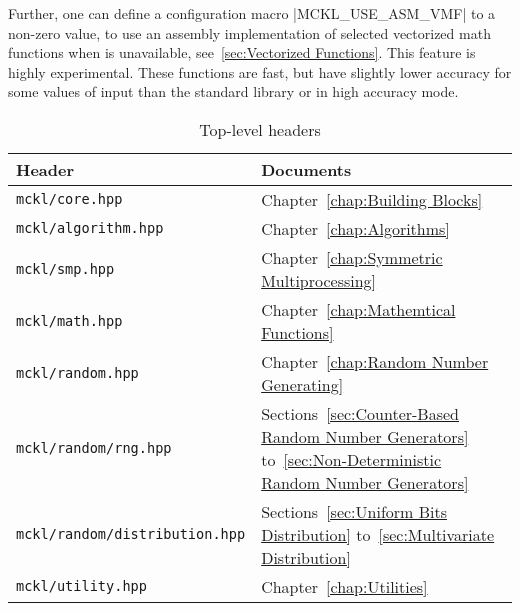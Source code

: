 Further, one can define a configuration macro |MCKL_USE_ASM_VMF| to a non-zero
value, to use an assembly implementation of selected vectorized math functions
when \mkl \vml is unavailable, see~\ref{sec:Vectorized Functions}. This feature
is highly experimental. These functions are fast, but have slightly lower
accuracy for some values of input than the standard library or \mkl \vml in
high accuracy mode.

\begin{table}[ht]
  \begin{tabularx}{\textwidth}{LL}
    \toprule
    Header & Documents \\
    \midrule
    \texttt{mckl/core.hpp}     & Chapter~\ref{chap:Building Blocks}          \\
    \texttt{mckl/algorithm.hpp}& Chapter~\ref{chap:Algorithms}               \\
    \texttt{mckl/smp.hpp}      & Chapter~\ref{chap:Symmetric Multiprocessing}\\
    \texttt{mckl/math.hpp}     & Chapter~\ref{chap:Mathemtical Functions}    \\
    \texttt{mckl/random.hpp}   & Chapter~\ref{chap:Random Number Generating} \\
    \texttt{mckl/random/rng.hpp}
    & Sections~\ref{sec:Counter-Based Random Number Generators}
    to~\ref{sec:Non-Deterministic Random Number Generators} \\
    \texttt{mckl/random/distribution.hpp}
    & Sections~\ref{sec:Uniform Bits Distribution}
    to~\ref{sec:Multivariate Distribution} \\
    \texttt{mckl/utility.hpp} & Chapter~\ref{chap:Utilities} \\
    \bottomrule
  \end{tabularx}
  \caption{Top-level headers}
  \label{tab:headers}
\end{table}
